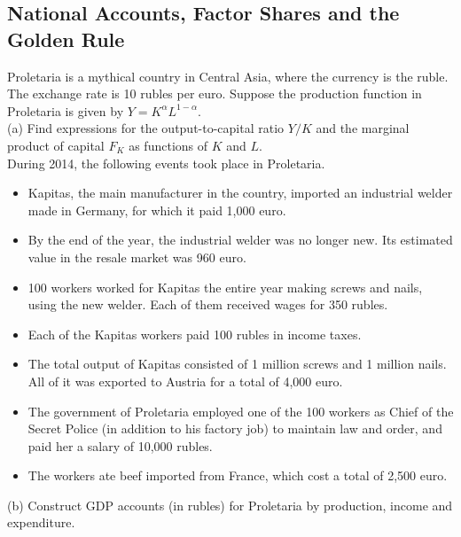 \documentclass[12pt, letterpaper]{article}
\begin{document}
\subsection{National Accounts, Factor Shares and the Golden Rule}

\begin{tcolorbox}[oddbox,title={Problem 5.7 \quad GDP Accounting, Interest Rates and Growth Accounting}]
\begin{tcolorbox}[questionbox]
Proletaria is a mythical country in Central Asia, where the currency is the ruble. The
exchange rate is 10 rubles per euro. Suppose the production function in Proletaria is given
by $Y=K^{\alpha}L^{1-\alpha}$.\\[3pt]
(a) Find expressions for the output-to-capital ratio $Y/K$ and the marginal product of
capital $F_K$ as functions of $K$ and $L$.\\[3pt]
During 2014, the following events took place in Proletaria.
\begin{itemize}[leftmargin=1.1em,itemsep=1pt,topsep=2pt]
\item Kapitas, the main manufacturer in the country, imported an industrial welder made in
Germany, for which it paid 1,000 euro.
\item By the end of the year, the industrial welder was no longer new. Its estimated value
in the resale market was 960 euro.
\item 100 workers worked for Kapitas the entire year making screws and nails, using the new
welder. Each of them received wages for 350 rubles.
\item Each of the Kapitas workers paid 100 rubles in income taxes.
\item The total output of Kapitas consisted of 1 million screws and 1 million nails. All of
it was exported to Austria for a total of 4,000 euro.
\item The government of Proletaria employed one of the 100 workers as Chief of the Secret
Police (in addition to his factory job) to maintain law and order, and paid her a salary of
10,000 rubles.
\item The workers ate beef imported from France, which cost a total of 2,500 euro.
\end{itemize}
(b) Construct GDP accounts (in rubles) for Proletaria by production, income and expenditure.\\

\end{tcolorbox}
\end{tcolorbox}
\end{document}
